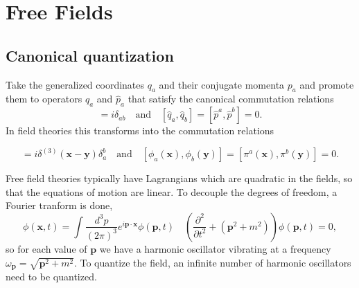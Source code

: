 \chapter{Free Fields}
\section{Canonical quantization}
Take the generalized coordinates $q_a$ and their conjugate momenta $p_a$ and promote them to operators $\hat{q}_a$ and $\hat{p}_a$ that satisfy the canonical commutation relations
\begin{equation}
[\hat{q}_a,\hat{p}^b]=i\delta_{ab} \quad \text{and} \quad [\hat{q}_a,\hat{q}_b]=[\hat{p}^a,\hat{p}^b]=0. 
\end{equation}
In field theories this transforms into the commutation relations
\begin{definition}
\begin{equation}
  [\phi_a(\mathbf{x}),\pi^b(\mathbf{y})]=i\delta^{(3)}(\mathbf{x}-\mathbf{y})\delta^b_a \quad \text{and} \quad [\phi_a(\mathbf{x}),\phi_b(\mathbf{y})]=[\pi^a(\mathbf{x}),\pi^b(\mathbf{y})]=0. 
\end{equation}
\vspace{-5mm}
\end{definition}

Free field theories typically have Lagrangians which are quadratic in the fields, so that the equations of motion are linear. To decouple the degrees of freedom, a Fourier tranform is done, 
\begin{equation}
  \phi(\mathbf{x},t)=\int \frac{d^3p}{(2\pi)^3}e^{i\mathbf{p}\cdot\mathbf{x}}\phi(\mathbf{p},t) \quad \left(\frac{\partial^2}{\partial t^2}+(\mathbf{p}^2+m^2)\right)\phi(\mathbf{p},t)=0, 
\end{equation}
so for each value of $\mathbf{p}$ we have a harmonic oscillator vibrating at a frequency $\omega_{\mathbf{p}}=\sqrt{\mathbf{p}^2+m^2}$. To quantize the field, an infinite number of harmonic oscillators need to be quantized. 
